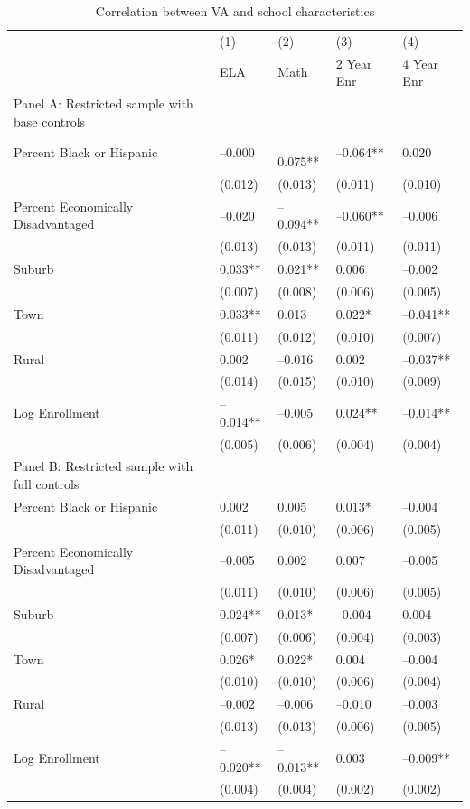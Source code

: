 \documentclass{article}
\begin{document}
\begin{table}[tbp] \centering
{}

\caption{Correlation between VA and school characteristics}
{\footnotesize
\begin{tabularx}{\linewidth}{lCCCC}

\toprule
&{(1)}&{(2)}&{(3)}&{(4)} \tabularnewline
{} & ELA & Math & 2 Year Enr & 4 Year Enr \tabularnewline
\midrule \addlinespace[\belowrulesep]
Panel A: Restricted sample with base controls&&&& \tabularnewline
\midrule Percent Black or Hispanic&--0.000&--0.075**&--0.064**&0.020 \tabularnewline
&(0.012)&(0.013)&(0.011)&(0.010) \tabularnewline
\midrule Percent Economically Disadvantaged&--0.020&--0.094**&--0.060**&--0.006 \tabularnewline
&(0.013)&(0.013)&(0.011)&(0.011) \tabularnewline
\midrule Suburb&0.033**&0.021**&0.006&--0.002 \tabularnewline
&(0.007)&(0.008)&(0.006)&(0.005) \tabularnewline
Town&0.033**&0.013&0.022*&--0.041** \tabularnewline
&(0.011)&(0.012)&(0.010)&(0.007) \tabularnewline
Rural&0.002&--0.016&0.002&--0.037** \tabularnewline
&(0.014)&(0.015)&(0.010)&(0.009) \tabularnewline
\midrule Log Enrollment&--0.014**&--0.005&0.024**&--0.014** \tabularnewline
&(0.005)&(0.006)&(0.004)&(0.004) \tabularnewline
\midrule \midrule Panel B: Restricted sample with full controls&&&& \tabularnewline
\midrule Percent Black or Hispanic&0.002&0.005&0.013*&--0.004 \tabularnewline
&(0.011)&(0.010)&(0.006)&(0.005) \tabularnewline
\midrule Percent Economically Disadvantaged&--0.005&0.002&0.007&--0.005 \tabularnewline
&(0.011)&(0.010)&(0.006)&(0.005) \tabularnewline
\midrule Suburb&0.024**&0.013*&--0.004&0.004 \tabularnewline
&(0.007)&(0.006)&(0.004)&(0.003) \tabularnewline
Town&0.026*&0.022*&0.004&--0.004 \tabularnewline
&(0.010)&(0.010)&(0.006)&(0.004) \tabularnewline
Rural&--0.002&--0.006&--0.010&--0.003 \tabularnewline
&(0.013)&(0.013)&(0.006)&(0.005) \tabularnewline
\midrule Log Enrollment&--0.020**&--0.013**&0.003&--0.009** \tabularnewline
&(0.004)&(0.004)&(0.002)&(0.002) \tabularnewline
\bottomrule 

\end{tabularx}
}
\end{table}
\end{document}
